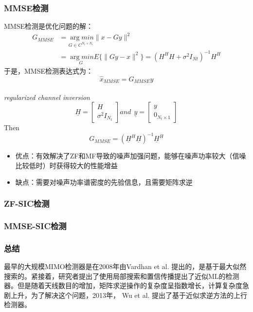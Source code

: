 \subsubsection{MMSE检测}
MMSE检测是优化问题的解：
\begin{equation}
\begin{aligned}
    G_{MMSE}&=\underset{G\in C^{N_t \times N_r}}{\arg min}\|x-Gy\|^2 \\
    &= \underset{G}{\arg min}E\{\|Gy-x\|^2\}=(H^HH+\sigma^2I_{Nt})^{-1}H^H
\end{aligned}
\end{equation}
于是，MMSE检测表达式为：
\begin{equation}
    \hat{x}_{MMSE}=G_{MMSE}y
\end{equation} \\

\emph{regularized channel inversion}
\begin{equation}
    \underline{H}=\begin{bmatrix}
        H \\
        \sigma^2I_{N_t}
        \end{bmatrix} and  \ \ 
        \underline{y}=
        \begin{bmatrix}
        y \\
        0_{N_t\times1}
        \end{bmatrix} 
\end{equation}
Then
\begin{equation}
    G_{MMSE}=(\underline{H}^H\underline{H})^{-1}\underline{H}^H
\end{equation}
\begin{itemize}
    \item 优点：有效解决了ZF和MF导致的噪声加强问题，能够在噪声功率较大（信噪比较低时）时获得较大的性能增益
    \item 缺点：需要对噪声功率谱密度的先验信息，且需要矩阵求逆
\end{itemize}

\subsubsection{ZF-SIC检测}


\subsubsection{MMSE-SIC检测}
\subsubsection{总结}
最早的大规模MIMO检测器是在2008年由Vardhan et al. \cite{Vishnu2008A}提出的，是基于最大似然搜索的。紧接着，研究者提出了使用局部搜索和置信传播提出了近似ML的检测器。但是随着天线数目的增加，矩阵求逆操作的复杂度呈指数增长，计算复杂度急剧上升，为了解决这个问题，2013年，
Wu et al.\cite{2013Approximate} 提出了基于近似求逆方法的上行检测器。

